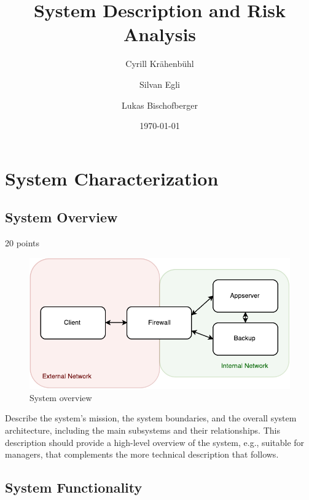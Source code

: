 \documentclass[english]{article}
\title{\huge\sffamily\bfseries System Description and Risk Analysis}
\author{Cyrill Krähenbühl \and Silvan Egli \and Lukas Bischofberger}
\date{\today}
\begin{document}
\maketitle


\tableofcontents
\pagebreak


\section{System Characterization}

\subsection{System Overview}

20 points

\begin{figure}[ht]
	\centering
	\includegraphics[scale=0.7]{systemoverview.pdf}
	\caption{System overview}
	\label{figure:systemoverview}
\end{figure}

Describe the system's mission,  the system boundaries,
and the overall system architecture, including the main subsystems and
their relationships.   This description should provide a high-level
overview of the system, e.g., suitable for managers, that complements
the more technical description that follows.


\subsection{System Functionality}
\end{document}
